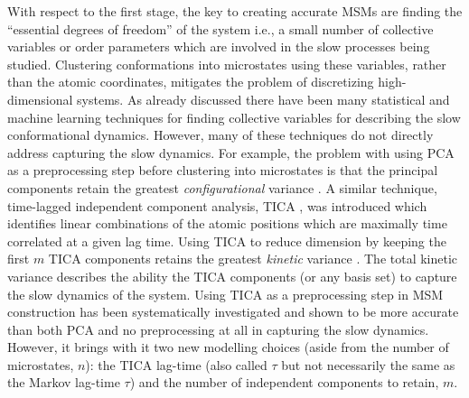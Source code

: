 With respect to the first stage, the key to creating accurate MSMs are finding the ``essential degrees of freedom'' of the system \cite{zwanzigClassicalDynamicsContinuous1983a, schutteDirectApproachConformational1999} i.e., a small number of collective variables or order parameters which are involved in the slow processes being studied. Clustering conformations into microstates using these variables, rather than the atomic coordinates, mitigates the problem of discretizing high-dimensional systems.  As already discussed there have been many statistical and machine learning techniques for finding collective variables for describing the slow conformational dynamics. However, many of these techniques do not directly address capturing the slow dynamics. For example, the problem with using PCA as a preprocessing step before clustering into microstates is that the principal components retain the greatest \emph{configurational} variance \cite{friedman2001elements}. A similar technique, time-lagged independent component analysis, TICA \cite{perez-hernandezIdentificationSlowMolecular2013a, schwantesImprovementsMarkovState2013}, was introduced which identifies linear combinations of the atomic positions which are maximally time correlated at a given lag time. Using TICA to reduce dimension by keeping the first $m$ TICA components retains the greatest \emph{kinetic} variance \cite{noeKineticDistanceKinetic2015}. The total kinetic variance describes the ability  the TICA components (or any basis set) to capture the slow dynamics of the system. Using TICA as a preprocessing step in MSM construction has been systematically investigated and shown to be more accurate than both PCA and no preprocessing at all \cite{husicOptimizedParameterSelection2016} in capturing the slow dynamics. However, it brings with it two new modelling choices (aside from the number of microstates, $n$): the TICA lag-time (also called $\tau$ but not necessarily the same as the Markov lag-time $\tau$) and the number of independent components to retain, $m$.  


